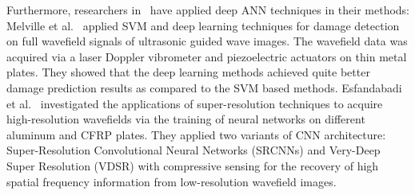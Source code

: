 Furthermore, researchers in~\cite{Melville2018,esfandabadideep}  have applied deep ANN techniques in their methods:
Melville et al.~\cite{Melville2018} applied SVM and deep learning techniques for damage detection on full wavefield signals of ultrasonic guided wave images. The wavefield data was acquired via a laser Doppler vibrometer and piezoelectric actuators on thin metal plates. 
They showed that the deep learning methods achieved quite better damage prediction results as compared to the SVM based methods. 
Esfandabadi et al.~\cite{esfandabadideep} investigated the applications of super-resolution techniques to acquire high-resolution wavefields via the training of neural networks on different aluminum and CFRP plates. 
They applied two variants of CNN architecture: Super-Resolution Convolutional Neural Networks (SRCNNs) and Very-Deep Super Resolution (VDSR) with compressive sensing for the recovery of high spatial frequency information from low-resolution wavefield images. 